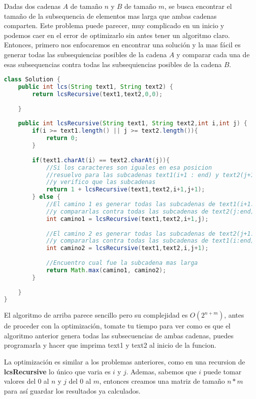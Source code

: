  Dadas dos cadenas $A$ de tamaño $n$ y $B$ de tamaño $m$, se busca encontrar el tamaño de la subsequencia de elementos mas larga que ambas cadenas comparten. Este problema puede parecer, muy complicado en un inicio y podemos caer en el error de optimizarlo sin antes tener un algoritmo claro. Entonces, primero nos enfocaremos en encontrar una solución y la mas fácil es generar todas las subsequiencias posibles de la cadena $A$ y comparar cada una de esas subsequencias contra todas las subsequiencias posibles de la cadena $B$.
 
\begin{lstlisting}[language=Java, caption=LCS no optimo]
class Solution {
    public int lcs(String text1, String text2) {
        return lcsRecursive(text1,text2,0,0);
        
    }
    
    public int lcsRecursive(String text1, String text2,int i,int j) {
        if(i >= text1.length() || j >= text2.length()){
            return 0;
        }
        
        if(text1.charAt(i) == text2.charAt(j)){
            //Si los caracteres son iguales en esa posicion
            //resuelvo para las subcadenas text1(i+1 : end) y text2(j+1 : end)
            //y verifico que las subcadenas
            return 1 + lcsRecursive(text1,text2,i+1,j+1);
        } else {
            //El camino 1 es generar todas las subcadenas de text1(i+1:end)
            //y compararlas contra todas las subcadenas de text2(j:end)
            int camino1 = lcsRecursive(text1,text2,i+1,j);
            
            //El camino 2 es generar todas las subcadenas de text2(j+1:end)
            //y compararlas contra todas las subcadenas de text1(i:end)
            int camino2 = lcsRecursive(text1,text2,i,j+1);
            
            //Encuentro cual fue la subcadena mas larga
            return Math.max(camino1, camino2); 
        }
        
    }
}
\end{lstlisting}

El algoritmo de arriba parece sencillo pero su complejidad es $O(2^{n+m})$, antes de proceder con la optimización, tomate tu tiempo para ver como es que el algoritmo anterior genera todas las subsecuencias de ambas cadenas, puedes programarla y hacer que imprima text1 y text2 al inicio de la funcion.

La optimización es similar a los problemas anteriores, como en una recursion de \textbf{lcsRecursive} lo único que varia es $i$ y $j$. Ademas, sabemos que $i$ puede tomar valores del $0$ al $n$ y $j$ del $0$ al $m$, entonces creamos una matriz de tamaño $n*m$ para así guardar los resultados ya calculados.


